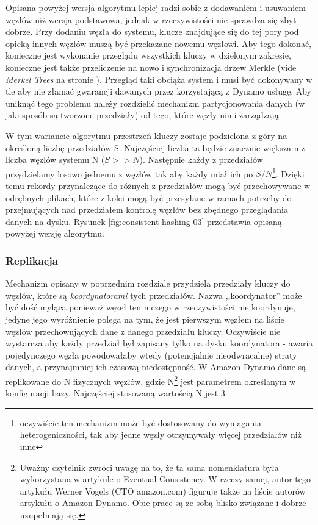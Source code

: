 
Opisana powyżej wersja algorytmu lepiej radzi sobie z dodawaniem i usuwaniem węzłów niż wersja podstawowa, jednak w rzeczywistości nie sprawdza się zbyt dobrze.
Przy dodaniu węzła do systemu, klucze znajdujące się do tej pory pod opieką innych węzłów muszą być przekazane nowemu węzłowi.
Aby tego dokonać, konieczne jest wykonanie przeglądu wszystkich kluczy w dzielonym zakresie, konieczne jest także przeliczenie na nowo i synchronizacja drzew Merkle (vide \emph{Merkel Trees} na stronie \pageref{merkle-trees}). 
Przegląd taki obciąża system i musi być dokonywany w tle aby nie złamać gwarancji dawanych przez korzystającą z Dynamo usługę.
Aby uniknąć tego problemu należy rozdzielić mechanizm partycjonowania danych (w jaki sposób są tworzone przedziały) od tego, które węzły nimi zarządzają.

W tym wariancie algorytmu przestrzeń kluczy zostaje podzielona z góry na określoną liczbę przedziałów S.
Najczęściej liczba ta będzie znacznie większa niż liczba węzłów systemu N ($S >> N$).
Następnie każdy z przedziałów przydzielamy losowo jednemu z węzłów tak aby każdy miał ich po $S/N$\footnote{oczywiście ten mechanizm może być dostosowany do wymagania heterogeniczności, tak aby jedne węzły otrzymywały więcej przedziałów niż inne}.
Dzięki temu rekordy przynależące do różnych z przedziałów mogą być przechowywane w odrębnych plikach, które z kolei mogą być przesyłane w ramach potrzeby do przejmujących nad przedziałem kontrolę węzłów bez zbędnego przeglądania danych na dysku.
Rysunek \ref{fig:consistent-hashing-03} przedstawia opisaną powyżej wersję algorytmu.


\subsubsection*{Replikacja}
\label{sec:dynamo-replikacja}

Mechanizm opisany w poprzednim rozdziale przydziela przedziały kluczy do węzłów, które są \emph{koordynatorami} tych przedziałów.
Nazwa ,,koordynator'' może być dość myląca ponieważ węzeł ten niczego w rzeczywistości nie koordynuje, jedyne jego wyróżnienie polega na tym, że jest pierwszym węzłem na liście węzłów przechowujących dane z danego przedziału kluczy.
Oczywiście nie wystarcza aby każdy przedział był zapisany tylko na dysku koordynatora - awaria pojedynczego węzła powodowałaby wtedy (potencjalnie nieodwracalne) straty danych, a przynajmniej ich czasową niedostępność.
W Amazon Dynamo dane są replikowane do N fizycznych węzłów, gdzie N\footnote{
Uważny czytelnik zwróci uwagę na to, że ta sama nomenklatura była wykorzystana w artykule o Eventual Consistency.
W rzeczy samej, autor tego artykułu Werner Vogels (CTO amazon.com) figuruje także na liście autorów artykułu o Amazon Dynamo.
Obie prace są ze sobą blisko związane i dobrze uzupełniają się.
}
jest parametrem określanym w konfiguracji bazy.
Najczęściej stosowaną wartością N jest 3.

